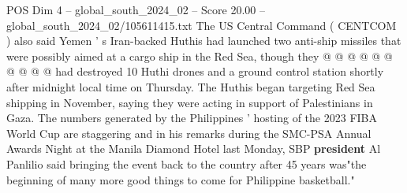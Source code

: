 \begin{textsample}{POS Dim 4 – global\_south\_2024\_02 – Score 20.00 – global\_south\_2024\_02/105611415.txt}
The US Central Command ( CENTCOM ) also said Yemen ' s Iran-backed Huthis had launched two anti-ship missiles that were possibly aimed at a cargo ship in the Red Sea, though they @ @ @ @ @ @ @ @ @ @ had destroyed 10 Huthi drones and a ground control station shortly after midnight local time on Thursday.
The Huthis began targeting Red Sea shipping in November, saying they were acting in support of Palestinians in Gaza.
The numbers generated by the Philippines ' hosting of the 2023 FIBA World Cup are staggering and in his remarks during the SMC-PSA Annual Awards Night at the Manila Diamond Hotel last Monday, SBP \textbf{president} Al Panlilio said bringing the event back to the country after 45 years was"the beginning of many more good things to come for Philippine basketball."

\end{textsample}
